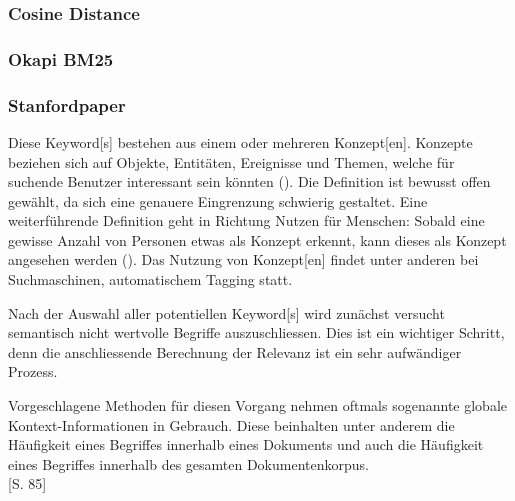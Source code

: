 \subsubsection{Cosine Distance}

\subsubsection{Okapi BM25}

\subsubsection{Stanfordpaper}

Diese \gls{Keyword}[s] bestehen aus einem oder mehreren \gls{Konzept}[en]. Konzepte beziehen sich auf Objekte, Entitäten, Ereignisse und Themen, welche für suchende Benutzer interessant sein könnten (\cite{dalvi2009web}). Die Definition ist bewusst offen gewählt, da sich eine genauere Eingrenzung schwierig gestaltet. Eine weiterführende Definition geht in Richtung Nutzen für Menschen: Sobald eine gewisse Anzahl von Personen etwas als Konzept erkennt, kann dieses als Konzept angesehen werden (\cite{parameswaran2010towards}). Das Nutzung von \gls{Konzept}[en] findet unter anderen bei Suchmaschinen, automatischem Tagging statt.

Nach der Auswahl aller potentiellen \gls{Keyword}[s] wird zunächst versucht semantisch nicht wertvolle Begriffe auszuschliessen. Dies ist ein wichtiger Schritt, denn die anschliessende Berechnung der Relevanz ist ein sehr aufwändiger Prozess. 




Vorgeschlagene Methoden für diesen Vorgang nehmen oftmals sogenannte globale Kontext-Informationen in Gebrauch. Diese beinhalten unter anderem die Häufigkeit eines Begriffes innerhalb eines Dokuments und auch die Häufigkeit eines Begriffes innerhalb des gesamten Dokumentenkorpus.
\\\cite{Zhang2006}[S. 85] %


